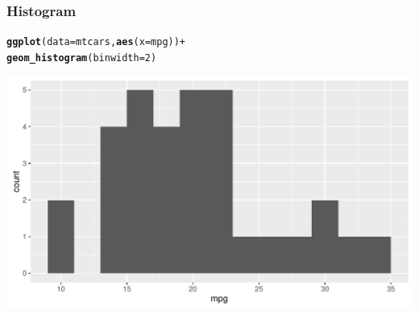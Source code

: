 \documentclass[12pt]{beamer}\usepackage[]{graphicx}\usepackage[]{color}
\makeatletter
\newcommand{\hlnum}[1]{\textcolor[rgb]{0.686,0.059,0.569}{#1}}%
\newcommand{\hlopt}[1]{\textcolor[rgb]{0,0,0}{#1}}%
\newcommand{\hlstd}[1]{\textcolor[rgb]{0.345,0.345,0.345}{#1}}%
\newcommand{\hlkwc}[1]{\textcolor[rgb]{0.333,0.667,0.333}{#1}}%
\newcommand{\hlkwd}[1]{\textcolor[rgb]{0.737,0.353,0.396}{\textbf{#1}}}%
\newenvironment{kframe}{%
 \def\at@end@of@kframe{}%
 \ifinner\ifhmode%
  \def\at@end@of@kframe{\end{minipage}}%
  \begin{minipage}{\columnwidth}%
 \fi\fi%
 \def\FrameCommand##1{\hskip\@totalleftmargin \hskip-\fboxsep
 \colorbox{shadecolor}{##1}\hskip-\fboxsep
     \hskip-\linewidth \hskip-\@totalleftmargin \hskip\columnwidth}%
 \MakeFramed {\advance\hsize-\width
   \@totalleftmargin\z@ \linewidth\hsize
   \@setminipage}}%
 {\par\unskip\endMakeFramed%
 \at@end@of@kframe}
\newenvironment{knitrout}{}{} %
\makeatother
\begin{document}
\begin{frame}[fragile]
\frametitle{Histogram}

\begin{knitrout}\scriptsize
{}\color{fgcolor}\begin{kframe}
\begin{alltt}
\hlkwd{ggplot}\hlstd{(}\hlkwc{data} \hlstd{= mtcars,} \hlkwd{aes}\hlstd{(}\hlkwc{x} \hlstd{= mpg))} \hlopt{+}
  \hlkwd{geom_histogram}\hlstd{(}\hlkwc{binwidth} \hlstd{=} \hlnum{2}\hlstd{)}
\end{alltt}
\end{kframe}

{\centering \includegraphics[width=.9\linewidth,height=.5\linewidth]{figure/unnamed-chunk-18-1} 

}



\end{knitrout}

\end{frame}

\end{document}
